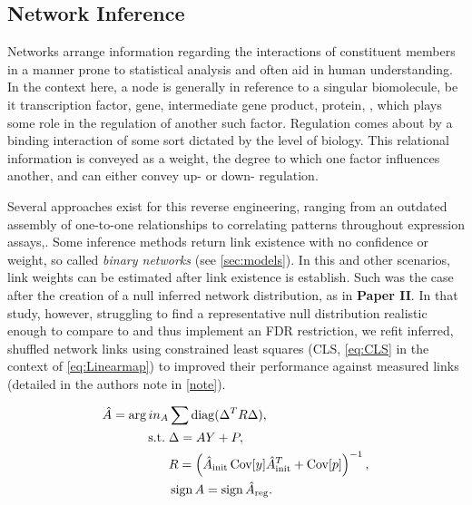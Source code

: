 
\subsection{Network Inference}
\label{sec:netinf}
Networks arrange information regarding the interactions of constituent members in a manner prone to statistical analysis and often aid in human understanding. In the context here, a node is generally in reference to a singular biomolecule, be it transcription factor, gene, intermediate gene product, protein, \etc, which plays some role in the regulation of another such factor. Regulation comes about by a binding interaction of some sort dictated by the level of biology. This relational information is conveyed as a weight, the degree to which one factor influences another, and can either convey up- or down- regulation.

Several approaches exist for this reverse engineering, ranging from an outdated assembly of one-to-one relationships to correlating patterns throughout expression assays,\etc. Some inference methods return link existence with no confidence or weight, so called \emph{binary networks} (see \cref{sec:models}). In this and other scenarios, link weights can be estimated after link existence is establish. Such was the case after the creation of a null inferred network distribution, as in \textbf{Paper II}. In that study, however, struggling to find a representative null distribution realistic enough to compare to and thus implement an FDR restriction, we refit inferred, shuffled network links using constrained least squares (CLS, \cref{eq:CLS} in the context of \cref{eq:Linearmap}) to improved their performance against measured links (detailed in the authors note in \cref{note}). 


\begin{equation}%
\begin{aligned}\label{eq:CLS}
  \hat{A} = \arg in_{A} & \sum \diag(\Delta^TR \Delta), \\
  \text{s.t.}\; & \Delta = A Y + P, \\
  & R = \left( \hat{A}_{\textrm{init}} \Cov[y] \hat{A}_{\textrm{init}}^{T} + \Cov[p]\right)^{-1},\\ %
  & \sign{A} = \sign{\hat{A}_{\textrm{reg}}}. \\
\end{aligned}
\end{equation}

